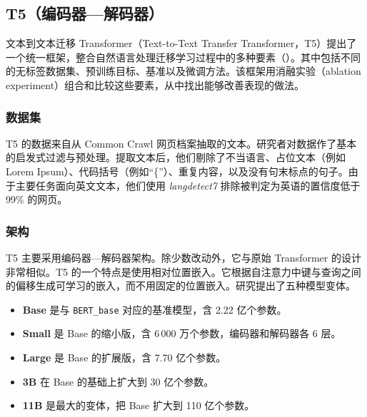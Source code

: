 \subsection{T5（编码器—解码器）}
文本到文本迁移 Transformer（Text-to-Text Transfer Transformer，T5）提出了一个统一框架，整合自然语言处理迁移学习过程中的多种要素（）。其中包括不同的无标签数据集、预训练目标、基准以及微调方法。该框架用消融实验（ablation experiment）组合和比较这些要素，从中找出能够改善表现的做法。

\subsubsection{数据集}
T5 的数据来自从 Common Crawl 网页档案抽取的文本。研究者对数据作了基本的启发式过滤与预处理。提取文本后，他们剔除了不当语言、占位文本（例如 Lorem Ipsum）、代码括号（例如“\{”）、重复内容，以及没有句末标点的句子。由于主要任务面向英文文本，他们使用 \textit{langdetect7} 排除被判定为英语的置信度低于 99\% 的网页。

\subsubsection{架构}
T5 主要采用编码器—解码器架构。除少数改动外，它与原始 Transformer 的设计非常相似。T5 的一个特点是使用相对位置嵌入。它根据自注意力中键与查询之间的偏移生成可学习的嵌入，而不用固定的位置嵌入。研究提出了五种模型变体。
\begin{itemize}
\item \textbf{Base} 是与 \texttt{BERT\_base} 对应的基准模型，含 2.22 亿个参数。
\item \textbf{Small} 是 Base 的缩小版，含 6\,000 万个参数，编码器和解码器各 6 层。
\item \textbf{Large} 是 Base 的扩展版，含 7.70 亿个参数。
\item \textbf{3B} 在 Base 的基础上扩大到 30 亿个参数。
\item \textbf{11B} 是最大的变体，把 Base 扩大到 110 亿个参数。
\end{itemize}

